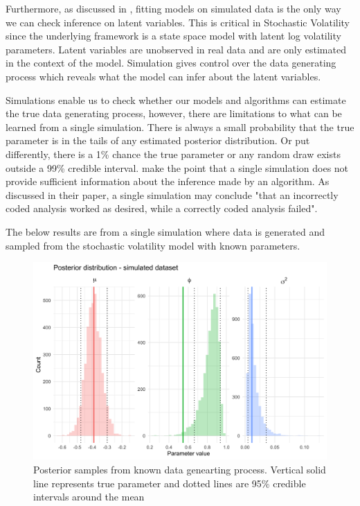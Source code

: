 \documentclass[12pt, a4paper]{article}
\begin{document}
    Furthermore, as discussed in \citet{gelman2020bayesian}, fitting models on simulated data is the only way we can check inference on latent variables. This is critical in Stochastic Volatility since the underlying framework is a state space model with latent log volatility parameters. Latent variables are unobserved in real data and are only estimated in the context of the model. Simulation gives control over the data generating process which reveals what the model can infer about the latent variables. 

    Simulations enable us to check whether our models and algorithms can estimate the true data generating process, however, there are limitations to what can be learned from a single simulation. There is always a small probability that the true parameter is in the tails of any estimated posterior distribution. Or put differently, there is a 1\% chance the true parameter or any random draw exists outside a 99\% credible interval. \cite{talts2018validating} make the point that a single simulation does not provide sufficient information about the inference made by an algorithm. As discussed in their paper, a single simulation may conclude "that an incorrectly coded analysis worked as desired, while a correctly coded analysis failed". 

    The below results are from a single simulation where data is generated and sampled from the stochastic volatility model with known parameters.

    \begin{figure}[h]
        \centering
        \includegraphics[scale=0.1]{motivating_example/single_sim.png}
        \caption{Posterior samples from known data genearting process. Vertical solid line represents true parameter and dotted lines are 95\% credible intervals around the mean}
    \end{figure}
\end{document}
